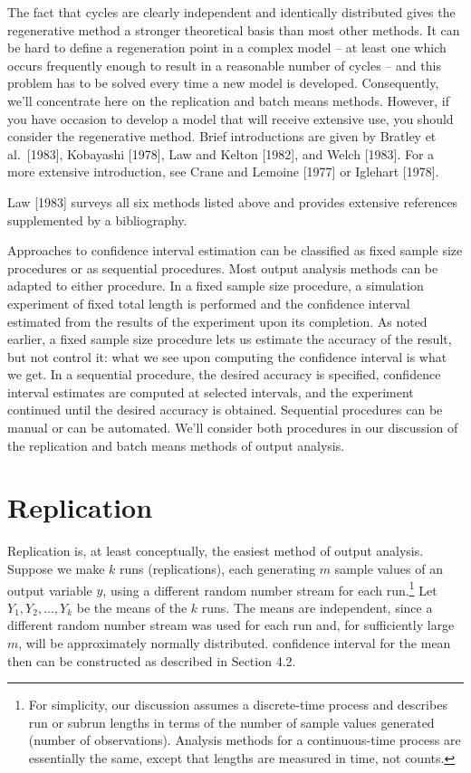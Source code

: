 The fact that cycles are clearly independent and identically distributed
gives the regenerative method a stronger theoretical basis than most other
methods. It can be hard to define a regeneration point in a complex model --
at least one which occurs frequently enough to result in a reasonable number
of cycles -- and this problem has to be solved every time a new model is
developed. Consequently, we'll concentrate here on the replication and batch
means methods. However, if you have occasion to develop a model that will
receive extensive use, you should consider the regenerative method. Brief
introductions are given by Bratley et al.\ [1983], Kobayashi [1978], Law and
Kelton [1982], and Welch [1983]. For a more extensive introduction, see Crane
and Lemoine [1977] or Iglehart [1978].

Law [1983] surveys all six methods listed above and provides extensive
references supplemented by a bibliography.

Approaches to confidence interval estimation can be classified as fixed sample
size procedures or as sequential procedures. Most output analysis methods can
be adapted to either procedure. In a fixed sample size procedure, a simulation
experiment of fixed total length is performed and the confidence interval
estimated from the results of the experiment upon its completion. As noted
earlier, a fixed sample size procedure lets us estimate the accuracy of the
result, but not control it: what we see upon computing the confidence interval
is what we get. In a sequential procedure, the desired accuracy is specified,
confidence interval estimates are computed at selected intervals, and the
experiment continued until the desired accuracy is obtained. Sequential
procedures can be manual or can be automated. We'll consider both procedures
in our discussion of the replication and batch means methods of output
analysis.

\section{Replication}
\label{sec:replication}

Replication is, at least conceptually, the easiest method of output analysis.
Suppose we make $k$ runs (replications), each generating $m$ sample values of
an output variable $y$, using a different random number stream for each
run.\footnote{For simplicity, our discussion assumes a discrete-time process
and describes run or subrun lengths in terms of the number of sample values
generated (number of observations). Analysis methods for a continuous-time
process are essentially the same, except that lengths are measured in time,
not counts.} Let $Y_1, Y_2, \ldots, Y_k$ be the means of the $k$ runs. The means
are independent, since a different random number stream was used for each run
and, for sufficiently large $m$, will be approximately normally distributed.
confidence interval for the mean then can be constructed as described in
Section 4.2.


